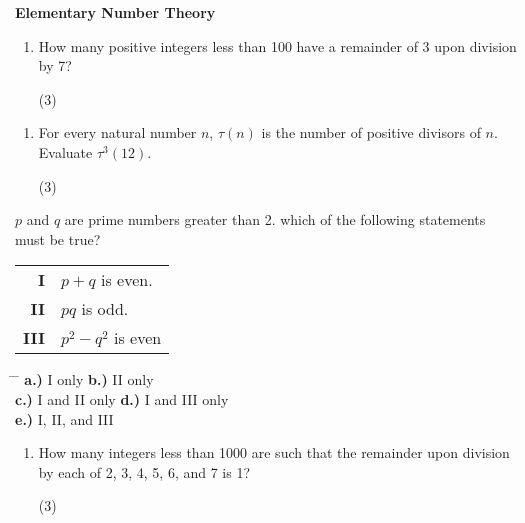 \documentclass{amsart}
\begin{document}
	
	
	\begin{center}\Large{\textbf{Elementary Number Theory}}\end{center}\vskip0.25in
	
	\begin{enumerate}[itemsep=\baselineskip]
		\item How many positive integers less than 100 have a remainder of 3 upon division by 7?
		\begin{tasks}(3)
		\end{tasks}
	\end{enumerate}
	
	\begin{enumerate}[start=2, itemsep=\baselineskip]
		\item For every natural number $n$, $\tau(n)$ is the number of positive divisors of $n$. Evaluate $\tau^{3}(12)$.
		\begin{tasks}(3)
			\task 1
			\task 2
			\task 3
			\task 4
			\task 6
		\end{tasks}
	\end{enumerate}
	
	
	
	$p$ and $q$ are prime numbers greater than 2. which of the following statements must be true? \\
	\hspace*{3em} \hphantom{3.)\ }
	\begin{tabular}{r l}
		{\bf I}     &   \hspace*{-0.5em}$p + q$ is even. \\
		{\bf II}    &   \hspace*{-0.5em}$pq$ is odd. \\
		{\bf III}   &   \hspace*{-0.5em}$p^{2} - q^{2}$ is even
	\end{tabular}
	\begin{tabbing}
		\hspace*{2em} \= \hspace{2.5in} \= \kill
		\> {\textbf{a.) }}I only        \> {\textbf{b.) }}II only \\
		\> {\textbf{c.) }}I and II only \> {\textbf{d.) }}I and III only \\
		\> {\textbf{e.) }}I, II, and III
	\end{tabbing}
	\vskip0.25in
	
	
	\begin{enumerate}[start=4, itemsep=\baselineskip]
		\item How many integers less than 1000 are such that the remainder upon division by each of 2, 3, 4, 5, 6, and 7 is 1?
		\begin{tasks}(3)
			\task 0
		\end{tasks}
	\end{enumerate}
	
\end{document}

